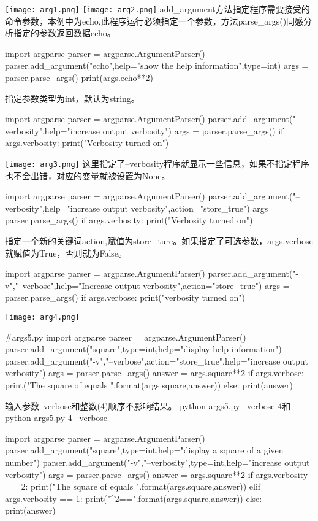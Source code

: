 \texttt{[image: arg1.png]}\newline
\texttt{[image: arg2.png]}\newline
add\_argument方法指定程序需要接受的命令参数，本例中为echo,此程序运行必须指定一个参数，方法parse\_args()同感分析指定的参数返回数据echo。
\begin{python}
import argparse
parser = argparse.ArgumentParser()
parser.add_argument("echo",help="show the help information",type=int)
args = parser.parse_args()
print(args.echo**2)
\end{python}
指定参数类型为int，默认为string。
\begin{python}
import argparse
parser = argparse.ArgumentParser()
parser.add_argument("--verbosity",help="increase output verbosity")
args = parser.parse_args()
if args.verbosity:
    print("Verbosity turned on")
\end{python}
\texttt{[image: arg3.png]}\newline
这里指定了--verbosity程序就显示一些信息，如果不指定程序也不会出错，对应的变量就被设置为None。
\begin{python}
import argparse
parser = argparse.ArgumentParser()
parser.add_argument("--verbosity",help="increase output verbosity",action="store_true")
args = parser.parse_args()
if args.verbosity:
    print("Verbosity turned on")
\end{python}
指定一个新的关键词action,赋值为store\_ture。如果指定了可选参数，args.verbose就赋值为True，否则就为False。
\begin{python}
import argparse
parser = argparse.ArgumentParser()
parser.add_argument("-v","--verbose",help="Increase output verbosity",action="store_true")
args = parser.parse_args()
if args.verbose:
    print("verbosity turned on")
\end{python}
\texttt{[image: arg4.png]}\newline
\begin{python}
#args5.py
import argparse
parser = argparse.ArgumentParser()
parser.add_argument("square",type=int,help="display help information")
parser.add_argument("-v","--verbose",action="store_true",help="increase output verbosity")
args = parser.parse_args()
answer = args.square**2
if args.verbose:
    print("The square of {} equals {}".format(args.square,answer))
else:
    print(answer)
\end{python}
输入参数--verbose和整数(4)顺序不影响结果。
python args5.py --verbose 4和python args5.py 4 --verbose
\begin{python}
import argparse
parser = argparse.ArgumentParser()
parser.add_argument("square",type=int,help="display a square of a given number")
parser.add_argument("-v","--verbosity",type=int,help="increase output verbosity")
args = parser.parse_args()
answer = args.square**2
if args.verbosity == 2:
    print("The square of {} equals {}".format(args.square,answer))
elif args.verbosity == 1:
    print("{}^2=={}".format(args.square,answer))
else:
    print(answer)
\end{python}
